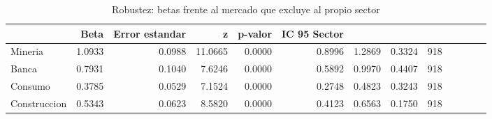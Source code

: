 \begin{table}
\caption{Robustez: betas frente al mercado que excluye al propio sector}
\label{tab:tabla6_betas_robustez}
\begin{tabular}{lrrrrrrrr}
\toprule
 & Beta & Error estandar & z & p-valor & IC 95%
Sector &  &  &  &  &  &  &  &  \\
\midrule
Mineria & 1.0933 & 0.0988 & 11.0665 & 0.0000 & 0.8996 & 1.2869 & 0.3324 & 918 \\
Banca & 0.7931 & 0.1040 & 7.6246 & 0.0000 & 0.5892 & 0.9970 & 0.4407 & 918 \\
Consumo & 0.3785 & 0.0529 & 7.1524 & 0.0000 & 0.2748 & 0.4823 & 0.3243 & 918 \\
Construccion & 0.5343 & 0.0623 & 8.5820 & 0.0000 & 0.4123 & 0.6563 & 0.1750 & 918 \\
\bottomrule
\end{tabular}
\end{table}
